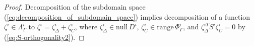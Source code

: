 \begin{proof}
Decomposition of the subdomain space (\ref{eq:decomposition_of_subdomain_space})
implies decomposition of a function $\zeta^{i} \in {\Lambda}_{\Gamma}^{i}$ to $\zeta^{i} =  \zeta^{i}_{\Delta} + \zeta^{i}_{C}$,
where $\zeta^{i}_{\Delta} \in \mathrm{null}\,D^{i}$, $\zeta^{i}_{C} \in \mathrm{range}\,\Phi_{\Gamma}^{i}$, 
and $\zeta^{iT}_{\Delta} S^{i} \zeta^{i}_{C} = 0$ by (\ref{eq:S-orthogonality2}).



\end{proof}
